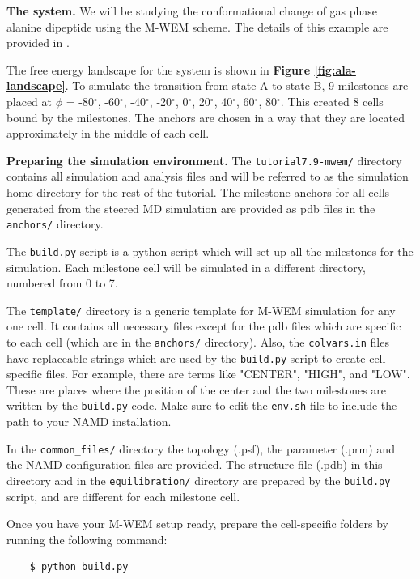 \textbf{The system.} We will be studying the conformational change of gas phase alanine dipeptide using the M-WEM scheme. 
The details of this example are provided in \citep{Ray2022Markovian}. 

The free energy landscape for the system is shown in \textbf{Figure \ref{fig:ala-landscape}}. 
To simulate the transition from state A to state B, 9 milestones are placed at $\phi$ = -80$^{\circ}$,  -60$^{\circ}$, -40$^{\circ}$, -20$^{\circ}$, 0$^{\circ}$, 20$^{\circ}$, 40$^{\circ}$, 60$^{\circ}$, 80$^{\circ}$. 
This created 8 cells bound by the milestones. 
The anchors are chosen in a way that they are located approximately in the middle of each cell.

\textbf{Preparing the simulation environment.} The \verb|tutorial7.9-mwem/| directory contains all simulation and analysis files and will be referred to as the simulation home directory for the rest of the tutorial. 
The milestone anchors for all cells generated from the steered MD simulation are provided as pdb files in the \verb|anchors/| directory. 

The \verb|build.py| script is a python script which will set up all the milestones for the simulation. 
Each milestone cell will be simulated in a different directory, numbered from 0 to 7. 

The \verb|template/| directory is a generic template for M-WEM simulation for any one cell. 
It contains all necessary files except for the pdb files which are specific to each cell (which are in the \verb|anchors/| directory). 
Also, the \verb|colvars.in| files have replaceable strings which are used by the \verb|build.py| script to create cell specific files. 
For example, there are terms like "CENTER", "HIGH", and "LOW". These are places where the position of the center and the two milestones are written by the \verb|build.py| code. 
Make sure to edit the \verb|env.sh| file to include the path to your NAMD installation.

In the \verb|common_files/| directory the topology (.psf), the parameter (.prm) and the NAMD configuration files are provided. 
The structure file (.pdb) in this directory and in the \verb|equilibration/| directory are prepared by the \verb|build.py| script, and are different for each milestone cell. 

Once you have your M-WEM setup ready, prepare the cell-specific folders by running the following command:

\begin{verbatim}
    $ python build.py
\end{verbatim}

